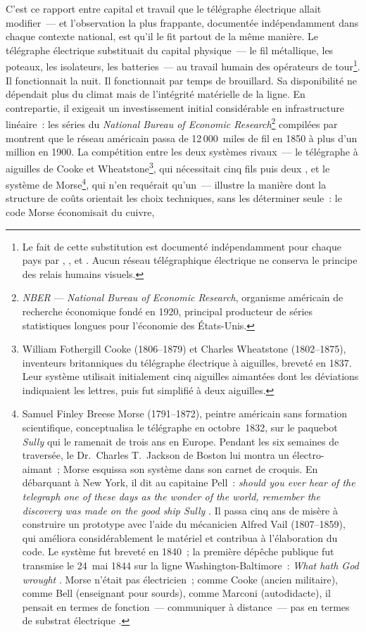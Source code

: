C'est ce rapport entre capital et travail que le télégraphe électrique allait modifier~--- et l'observation la plus frappante, documentée indépendamment dans chaque contexte national, est qu'il le fit partout de la même manière. Le télégraphe électrique substituait du capital physique~--- le fil métallique, les poteaux, les isolateurs, les batteries~--- au travail humain des opérateurs de tour\footnote{Le fait de cette substitution est documenté indépendamment pour chaque pays par \textcite{holzmann_early_1995}, \textcite{kieve_electric_1973}, \textcite{hubbard_cooke_1965} et \textcite{headrick_invisible_1991}. Aucun réseau télégraphique électrique ne conserva le principe des relais humains visuels.}. Il fonctionnait la nuit. Il fonctionnait par temps de brouillard. Sa disponibilité ne dépendait plus du climat mais de l'intégrité matérielle de la ligne. En contrepartie, il exigeait un investissement initial considérable en infrastructure linéaire~: les séries du \emph{National Bureau of Economic Research}\footnote{\emph{NBER} --- \emph{National Bureau of Economic Research}, organisme américain de recherche économique fondé en 1920, principal producteur de séries statistiques longues pour l'économie des États-Unis.} compilées par \textcite{gordon_capital_nineteenth} montrent que le réseau américain passa de 12\,000~miles de fil en 1850 à plus d'un million en 1900. La compétition entre les deux systèmes rivaux~--- le télégraphe à aiguilles de Cooke et Wheatstone\footnote{William Fothergill Cooke (1806--1879) et Charles Wheatstone (1802--1875), inventeurs britanniques du télégraphe électrique à aiguilles, breveté en 1837. Leur système utilisait initialement cinq aiguilles aimantées dont les déviations indiquaient les lettres, puis fut simplifié à deux aiguilles.}, qui nécessitait cinq fils puis deux \parencite{hubbard_cooke_1965}, et le système de Morse\footnote{Samuel Finley Breese Morse (1791--1872), peintre américain sans formation scientifique, conceptualisa le télégraphe en octobre~1832, sur le paquebot \emph{Sully} qui le ramenait de trois ans en Europe. Pendant les six semaines de traversée, le Dr.~Charles T.~Jackson de Boston lui montra un électro-aimant~; Morse esquissa son système dans son carnet de croquis. En débarquant à New York, il dit au capitaine Pell~: \og\emph{should you ever hear of the telegraph one of these days as the wonder of the world, remember the discovery was made on the good ship Sully}\fg{} \parencite[p.~251--257]{prime_life_1875}. Il passa cinq ans de misère à construire un prototype avec l'aide du mécanicien Alfred Vail (1807--1859), qui améliora considérablement le matériel et contribua à l'élaboration du code. Le système fut breveté en 1840~; la première dépêche publique fut transmise le 24~mai 1844 sur la ligne Washington-Baltimore~: \og\emph{What hath God wrought}\fg{} \parencite[p.~17]{bertho_histoire_1984}. Morse n'était pas électricien~; comme Cooke (ancien militaire), comme Bell (enseignant pour sourds), comme Marconi (autodidacte), il pensait en termes de fonction~--- communiquer à distance~--- pas en termes de substrat électrique \parencite{kooij_telegraph_2015}.}, qui n'en requérait qu'un~--- illustre la manière dont la structure de coûts orientait les choix techniques, sans les déterminer seule~: le code Morse économisait du cuivre, 